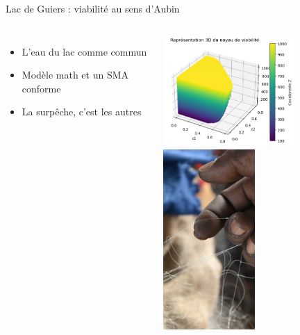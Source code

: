 \documentclass[newPxFont]{beamer}
\begin{document}
\begin{frame}[c]{Lac de Guiers : viabilité au sens d'Aubin}
  \vspace{-1cm}
  \begin{columns}[onlytextwidth,T]
    \column{\dimexpr\linewidth-30mm-5mm}
        \begin{itemize}
          \item L'eau du lac comme commun
          \item Modèle math et un SMA conforme
          \item La surpêche, c'est les autres
        \end{itemize}
        \includegraphics[width=5cm]{img/noyauViab.png}
    \column{30mm}
    \vspace{0.5cm}
          \includegraphics[width=3.5cm]{img/peche_mbane.JPG}
  \end{columns}
\end{frame}
\end{document}
